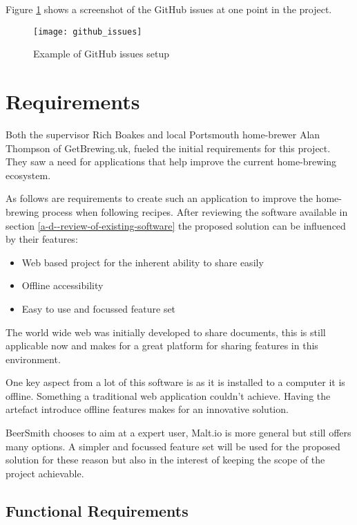 Figure \ref{figure-github-issues} shows a screenshot of the GitHub issues at one point in the project.

\begin{figure}[H]
  \centering
    \texttt{[image: github\_issues]}
  \caption{Example of GitHub issues setup}
  \label{figure-github-issues}
\end{figure}

\section{Requirements} \label{a-d--requirements}

Both the supervisor Rich Boakes and local Portsmouth home-brewer Alan Thompson of GetBrewing.uk, fueled the initial requirements for this project. They saw a need for applications that help improve the current home-brewing ecosystem.

As follows are requirements to create such an application to improve the home-brewing process when following recipes. After reviewing the software available in section \ref{a-d--review-of-existing-software} the proposed solution can be influenced by their features:

\begin{itemize}
  \item Web based project for the inherent ability to share easily
  \item Offline accessibility
  \item Easy to use and focussed feature set
\end{itemize}

The world wide web was initially developed to share documents, this is still applicable now and makes for a great platform for sharing features in this environment.

One key aspect from a lot of this software is as it is installed to a computer it is offline. Something a traditional web application couldn't achieve. Having the artefact introduce offline features makes for an innovative solution.

BeerSmith chooses to aim at a expert user, Malt.io is more general but still offers many options. A simpler and focussed feature set will be used for the proposed solution for these reason but also in the interest of keeping the scope of the project achievable.

\subsection{Functional Requirements} \label{a-d--requirements--functional}

